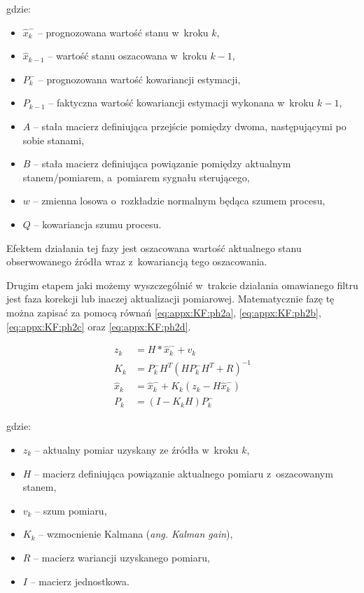 gdzie:
\begin{itemize}
	\item $\widehat{x}^-_k$ -- prognozowana wartość stanu w~kroku $k$,
	\item $\widehat{x}_{k-1}$ -- wartość stanu oszacowana w~kroku $k-1$,
	\item $P^-_k$ -- prognozowana wartość kowariancji estymacji,
	\item $P_{k-1}$ -- faktyczna wartość kowariancji estymacji wykonana w~kroku $k-1$,
	\item $A$ -- stała macierz definiująca przejście pomiędzy dwoma, następującymi po sobie stanami,
	\item $B$ --  stała macierz definiująca powiązanie pomiędzy aktualnym stanem/pomiarem, a~pomiarem sygnału sterującego,
	\item $w$ --  zmienna losowa o~rozkładzie normalnym będąca szumem procesu,
	\item $Q$ --  kowariancja szumu procesu.
\end{itemize}

Efektem działania tej fazy jest oszacowana wartość aktualnego stanu obserwowanego źródła wraz z~kowariancją tego oszacowania.

Drugim etapem jaki możemy wyszczególnić w~trakcie działania omawianego filtru jest faza korekcji lub inaczej aktualizacji pomiarowej. Matematycznie fazę tę można zapisać za pomocą równań \ref{eq:appx:KF:ph2a}, \ref{eq:appx:KF:ph2b}, \ref{eq:appx:KF:ph2c} oraz \ref{eq:appx:KF:ph2d}.

\begin{subequations}
	\begin{align}
		z_k           & = H*\widehat{x}^-_k + v_k \label{eq:appx:KF:ph2a}                        \\
		K_k           & = P^-_{k}H^T(HP^-_{k}H^T + R)^{-1} \label{eq:appx:KF:ph2b}               \\
		\widehat{x}_k & = \widehat{x}^-_k + K_{k}(z_k-H\widehat{x}^-_k)  \label{eq:appx:KF:ph2c} \\
		P_k           & = (I-K_{k}H)P^-_k \label{eq:appx:KF:ph2d}                                
	\end{align}
\end{subequations}

gdzie:
\begin{itemize}
	\item $z_k$ -- aktualny pomiar uzyskany ze źródła w~kroku $k$,
	\item $H$ -- macierz definiująca powiązanie aktualnego pomiaru z~oszacowanym stanem,
	\item $v_k$ -- szum pomiaru,
	\item $K_k$ -- wzmocnienie Kalmana (\emph{ang. Kalman gain}),
	\item $R$ -- macierz wariancji uzyskanego pomiaru,
	\item $I$ -- macierz jednostkowa.
\end{itemize}

